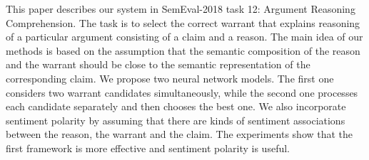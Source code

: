 This paper describes our system in SemEval-2018 task 12: Argument Reasoning Comprehension. The task is to select the correct warrant that explains reasoning of a particular argument consisting of a claim and a reason. The main idea of our methods is based on the assumption that the semantic composition of the reason and the warrant should be close to the semantic representation of the corresponding claim. We propose two neural network models. The first one considers two warrant candidates simultaneously, while the second one processes each candidate separately and then chooses the best one. We also incorporate sentiment polarity by assuming that there are kinds of sentiment associations between the reason, the warrant and the claim. The experiments show that the first framework is more effective and sentiment polarity is useful.
